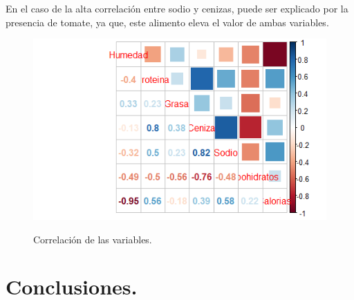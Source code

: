 \documentclass[12pt, letterpaper]{article}
\begin{document}
En el caso de la alta correlación entre sodio y cenizas, puede ser explicado por la presencia de tomate, ya que, este alimento eleva el valor de ambas variables.\\

\begin{figure}[h]
\centering
\includegraphics[scale=1]{images/corr.png} 
\label{i11}
\caption{Correlación de las variables.}
\end{figure}


 
 
 

\section{Conclusiones.}
\end{document}
